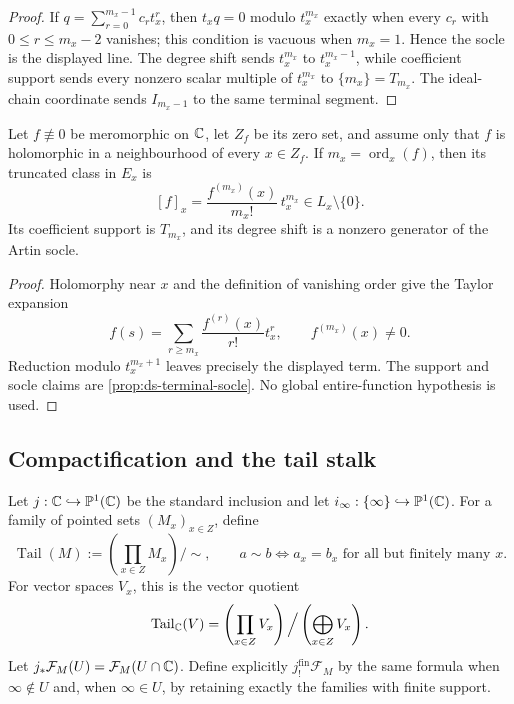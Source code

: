 \begin{proof}
If $q=\sum_{r=0}^{m_x-1}c_rt_x^r$, then $t_xq=0$ modulo $t_x^{m_x}$ exactly
when every $c_r$ with $0\leq r\leq m_x-2$ vanishes; this condition is vacuous
when $m_x=1$.  Hence the socle is the displayed line.
The degree shift sends $t_x^{m_x}$ to $t_x^{m_x-1}$, while coefficient support
sends every nonzero scalar multiple of $t_x^{m_x}$ to $\{m_x\}=T_{m_x}$.
The ideal-chain coordinate sends $I_{m_x-1}$ to the same terminal segment.
\end{proof}

\begin{theorem}
\label{thm:ds-leading-class}
Let $f\not\equiv0$ be meromorphic on $\mathbb C$, let $Z_f$ be its zero set, and assume only that
$f$ is holomorphic in a neighbourhood of every $x\in Z_f$.  If
$m_x=\operatorname{ord}_x(f)$, then its truncated class in $E_x$ is
\[
 [f]_x=\frac{f^{(m_x)}(x)}{m_x!}\,t_x^{m_x}
 \in L_x\setminus\{0\}.
\]
Its coefficient support is $T_{m_x}$, and its degree shift is a nonzero generator
of the Artin socle.
\end{theorem}

\begin{proof}
Holomorphy near $x$ and the definition of vanishing order give the Taylor
expansion
\[
 f(s)=\sum_{r\geq m_x}\frac{f^{(r)}(x)}{r!}t_x^r,
 \qquad f^{(m_x)}(x)\ne0.
\]
Reduction modulo $t_x^{m_x+1}$ leaves precisely the displayed term.  The support
and socle claims are \cref{prop:ds-terminal-socle}.  No global entire-function
hypothesis is used.
\end{proof}

\subsection{Compactification and the tail stalk}

Let $j:\mathbb C\hookrightarrow\mathbb P^1(\mathbb C)$ be the standard inclusion and let
$i_\infty:\{\infty\}\hookrightarrow\mathbb P^1(\mathbb C)$.  For a family of pointed
sets $(M_x)_{x\in Z}$, define
\[
 \operatorname{Tail}(M):=\left(\prod_{x\in Z}M_x\right)\!\big/\sim,
 \qquad
 a\sim b\iff a_x=b_x\text{ for all but finitely many }x.
\]
For vector spaces $V_x$, this is the vector quotient
\[
 \operatorname{Tail}_{\mathbb C}(V)
 =\left(\prod_{x\in Z}V_x\right)\Big/\left(\bigoplus_{x\in Z}V_x\right).
\]
Let $j_*\mathcal F_M(U)=\mathcal F_M(U\cap\mathbb C)$.  Define explicitly
$j^{\mathrm{fin}}_!\mathcal F_M$ by the same formula when $\infty\notin U$ and,
when $\infty\in U$, by retaining exactly the families with finite support.

